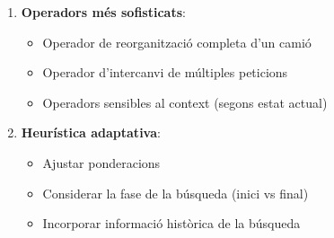 \begin{enumerate}
    \item \textbf{Operadors més sofisticats}:
    \begin{itemize}
        \item Operador de reorganització completa d'un camió
        \item Operador d'intercanvi de múltiples peticions
        \item Operadors sensibles al context (segons estat actual)
    \end{itemize}

    \newpage
    
    \item \textbf{Heurística adaptativa}:
    \begin{itemize}
        \item Ajustar ponderacions
        \item Considerar la fase de la búsqueda (inici vs final)
        \item Incorporar informació històrica de la búsqueda
    \end{itemize}
\end{enumerate}


